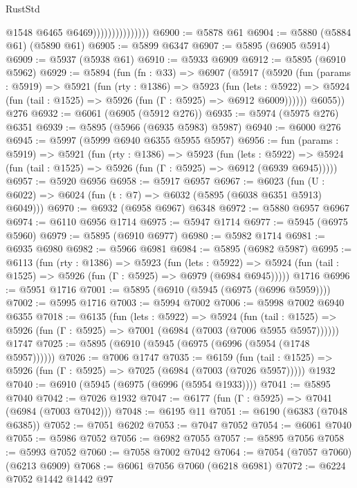 \begin{lexlean}{RustStd}
\begin{coremodule}
{{                                  @1548
                                  @6465
                                  @6469)))))))))))))))
@6900 := @5878 @61
@6904 := @5880 (@5884 @61) (@5890 @61)
@6905 := @5899 @6347
@6907 := @5895 (@6905 @5914)
@6909 := @5937 (@5938 @61)
@6910 := @5933 @6909
@6912 := @5895 (@6910 @5962)
@6929 := @5894
    (fun (fn : @33) =>
    @6907
      (@5917
        (@5920
          (fun (params : @5919) =>
          @5921
            (fun (rty : @1386) =>
            @5923
              (fun (lets : @5922) =>
              @5924 (fun (tail : @1525) => @5926 (fun (Γ : @5925) => @6912 @6009))))))
        @6055))
    @276
@6932 := @6061 (@6905 (@5912 @276))
@6935 := @5974 (@5975 @276) @6351
@6939 := @5895 (@5966 (@6935 @5983) @5987)
@6940 := @6000 @276
@6945 := @5997 (@5999 @6940 @6355 @5955 @5957)
@6956 := fun (params : @5919) =>
  @5921
    (fun (rty : @1386) =>
    @5923
      (fun (lets : @5922) =>
      @5924 (fun (tail : @1525) => @5926 (fun (Γ : @5925) => @6912 (@6939 @6945)))))
@6957 := @5920 @6956
@6958 := @5917 @6957
@6967 := @6023 (fun (U : @6022) => @6024 (fun (t : @7) => @6032 (@5895 (@6038 @6351 @5913) @6049)))
@6970 := @6932 (@6958 @6967) @6348
@6972 := @5880 @6957 @6967
@6974 := @6110 @6956 @1714
@6975 := @5947 @1714
@6977 := @5945 (@6975 @5960)
@6979 := @5895 (@6910 @6977)
@6980 := @5982 @1714
@6981 := @6935 @6980
@6982 := @5966 @6981
@6984 := @5895 (@6982 @5987)
@6995 := @6113
    (fun (rty : @1386) =>
    @5923
      (fun (lets : @5922) =>
      @5924 (fun (tail : @1525) => @5926 (fun (Γ : @5925) => @6979 (@6984 @6945)))))
    @1716
@6996 := @5951 @1716
@7001 := @5895 (@6910 (@5945 (@6975 (@6996 @5959))))
@7002 := @5995 @1716
@7003 := @5994 @7002
@7006 := @5998 @7002 @6940 @6355
@7018 := @6135
    (fun (lets : @5922) =>
    @5924
      (fun (tail : @1525) => @5926 (fun (Γ : @5925) => @7001 (@6984 (@7003 (@7006 @5955 @5957))))))
    @1747
@7025 := @5895 (@6910 (@5945 (@6975 (@6996 (@5954 (@1748 @5957))))))
@7026 := @7006 @1747
@7035 := @6159
    (fun (tail : @1525) => @5926 (fun (Γ : @5925) => @7025 (@6984 (@7003 (@7026 @5957)))))
    @1932
@7040 := @6910 (@5945 (@6975 (@6996 (@5954 @1933))))
@7041 := @5895 @7040
@7042 := @7026 @1932
@7047 := @6177 (fun (Γ : @5925) => @7041 (@6984 (@7003 @7042)))
@7048 := @6195 @11
@7051 := @6190 (@6383 (@7048 @6385))
@7052 := @7051 @6202
@7053 := @7047 @7052
@7054 := @6061 @7040
@7055 := @5986 @7052
@7056 := @6982 @7055
@7057 := @5895 @7056
@7058 := @5993 @7052
@7060 := @7058 @7002 @7042
@7064 := @7054 (@7057 @7060) (@6213 @6909)
@7068 := @6061 @7056 @7060 (@6218 @6981)
@7072 := @6224 @7052 @1442 @1442 @97
}}
\end{coremodule}
\end{lexlean}
